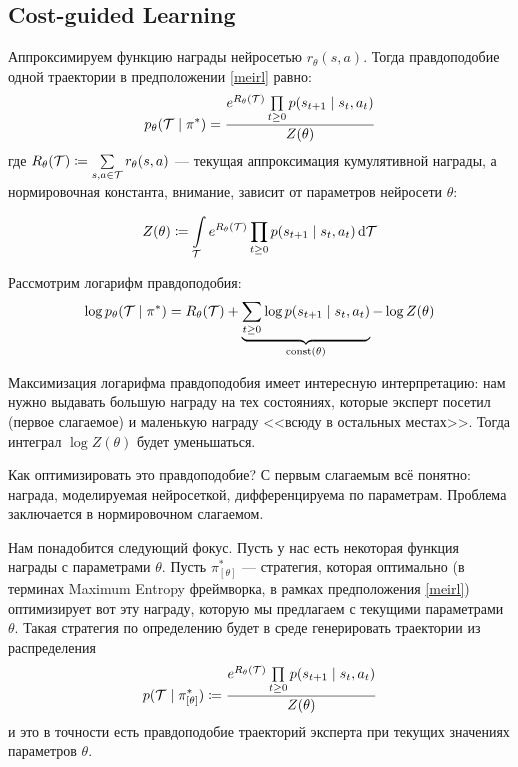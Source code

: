 \subsection{Cost-guided Learning}

Аппроксимируем функцию награды нейросетью $r_\theta(s, a)$. Тогда правдоподобие одной траектории в предположении \eqref{meirl} равно:
$$p_\theta(\mathcal{T} \mid \pi^*) = \frac{e^{R_{\theta}(\mathcal{T})} \prod\limits_{t \ge 0}p(s_{t+1} \mid s_t, a_t)}{Z(\theta)}$$
где $R_{\theta}(\mathcal{T}) \coloneqq \sum\limits_{s, a \in \mathcal{T}} r_{\theta}(s, a)$ --- текущая аппроксимация кумулятивной награды, а нормировочная константа, внимание, зависит от параметров нейросети $\theta$:

\begin{equation}\label{irl_partionfunction}
Z(\theta) \coloneqq \int\limits_{\mathcal{T}} e^{R_{\theta}(\mathcal{T})} \prod_{t \ge 0}p(s_{t+1} \mid s_t, a_t) \mathop{}\!\mathrm{d} \mathcal{T}
\end{equation}

Рассмотрим логарифм правдоподобия:
\begin{equation}\label{irl_loglikelihood}
\log p_\theta(\mathcal{T} \mid \pi^*) = R_{\theta}(\mathcal{T}) + \underbrace{\sum_{t \ge 0} \log p(s_{t+1} \mid s_t, a_t)}_{\operatorname{const}(\theta)} - \log Z(\theta)
\end{equation}

Максимизация логарифма правдоподобия имеет интересную интерпретацию: нам нужно выдавать большую награду на тех состояниях, которые эксперт посетил (первое слагаемое) и маленькую награду <<всюду в остальных местах>>. Тогда интеграл $\log Z(\theta)$ будет уменьшаться.

Как оптимизировать это правдоподобие? С первым слагаемым всё понятно: награда, моделируемая нейросеткой, дифференцируема по параметрам. Проблема заключается в нормировочном слагаемом.

Нам понадобится следующий фокус. Пусть у нас есть некоторая функция награды с параметрами $\theta$. Пусть $\pi^*_{[\theta]}$ --- стратегия, которая оптимально (в терминах Maximum Entropy фреймворка, в рамках предположения \eqref{meirl}) оптимизирует вот эту награду, которую мы предлагаем с текущими параметрами $\theta$. Такая стратегия по определению будет в среде генерировать траектории из распределения
\begin{equation}\label{irl_currentoptimalpolicy}
p(\mathcal{T} \mid \pi^*_{[\theta]}) \coloneqq \frac{e^{R_{\theta}(\mathcal{T})} \prod\limits_{t \ge 0}p(s_{t+1} \mid s_t, a_t)}{Z(\theta)}
\end{equation}
и это в точности есть правдоподобие траекторий эксперта при текущих значениях параметров $\theta$.

